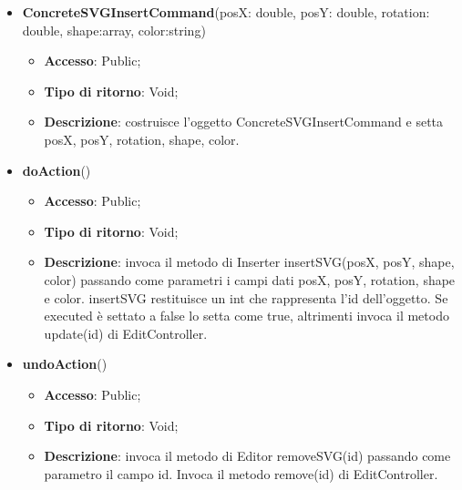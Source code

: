 {{{	
	\begin{itemize}
		\item \textbf{ConcreteSVGInsertCommand}(posX: double, posY: double, rotation: double, shape:array, color:string)
		\begin{itemize}
			\item \textbf{Accesso}: Public;
			\item \textbf{Tipo di ritorno}: Void;
			\item \textbf{Descrizione}: costruisce l’oggetto ConcreteSVGInsertCommand e setta posX, posY, rotation, shape, color.
		\end{itemize}
		\item \textbf{doAction}()
		\begin{itemize}
			\item \textbf{Accesso}: Public;
			\item \textbf{Tipo di ritorno}: Void;
			\item \textbf{Descrizione}: invoca il metodo di Inserter insertSVG(posX, posY, shape, color) passando come parametri i  campi dati posX, posY, rotation, shape e color. insertSVG restituisce un int che rappresenta l’id dell’oggetto. Se executed è settato a false lo setta come true, altrimenti invoca il metodo update(id) di EditController.
		\end{itemize}
		\item \textbf{undoAction}()
		\begin{itemize}
			\item \textbf{Accesso}: Public;
			\item \textbf{Tipo di ritorno}: Void;
			\item \textbf{Descrizione}: invoca il metodo di Editor removeSVG(id) passando come parametro il campo id. Invoca il metodo remove(id) di EditController.
		\end{itemize}
	\end{itemize}
	}
}}
